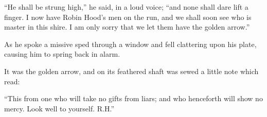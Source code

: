 ``He shall be strung high,'' he said, in a loud voice; ``and none shall
dare lift a finger. I now have Robin Hood's men on the run, and we shall
soon see who is master in this shire. I am only sorry that we let them
have the golden arrow.''

As he spoke a missive sped through a window and fell clattering upon his
plate, causing him to spring back in alarm.

It was the golden arrow, and on its feathered shaft was sewed a little
note which read:

``This from one who will take no gifts from liars; and who henceforth
will show no mercy. Look well to yourself. R.H.''
